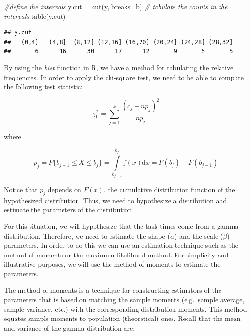 \documentclass[
]{book}
\newenvironment{Shaded}{\begin{snugshade}}{\end{snugshade}}
\newcommand{\AttributeTok}[1]{\textcolor[rgb]{0.77,0.63,0.00}{#1}}
\newcommand{\CommentTok}[1]{\textcolor[rgb]{0.56,0.35,0.01}{\textit{#1}}}
\newcommand{\FunctionTok}[1]{\textcolor[rgb]{0.00,0.00,0.00}{#1}}
\newcommand{\NormalTok}[1]{#1}
\newcommand{\OtherTok}[1]{\textcolor[rgb]{0.56,0.35,0.01}{#1}}
\theoremstyle{definition}
\theoremstyle{definition}
\theoremstyle{definition}
\theoremstyle{definition}
\theoremstyle{remark}
\begin{document}
\begin{Shaded}
\begin{Highlighting}[]
\CommentTok{\#define the intervals}
\NormalTok{y.cut }\OtherTok{=} \FunctionTok{cut}\NormalTok{(y, }\AttributeTok{breaks=}\NormalTok{b)}
\CommentTok{\# tabulate the counts in the intervals}
\FunctionTok{table}\NormalTok{(y.cut)}
\end{Highlighting}
\end{Shaded}

\begin{verbatim}
## y.cut
##   (0,4]   (4,8]  (8,12] (12,16] (16,20] (20,24] (24,28] (28,32] 
##       6      16      30      17      12       9       5       5
\end{verbatim}

By using the \emph{hist} function in R, we have a method for tabulating
the relative frequencies. In order to apply the chi-square test, we need
to be able to compute the following test statistic:

\begin{equation}
\chi^{2}_{0} = \sum\limits_{j=1}^{k} \frac{\left( c_{j} - np_{j} \right)^{2}}{np_{j}}
\label{eq:chisqd}
\end{equation}

where

\begin{equation}
p_j = P\{b_{j-1} \leq X \leq b_{j}\} = \int\limits_{b_{j-1}}^{b_{j}} f(x) \mathrm{d}x = F(b_{j}) - F(b_{j-1})
\label{eq:psubj}
\end{equation}

Notice that \(p_{j}\) depends on \(F(x)\), the cumulative distribution
function of the hypothesized distribution. Thus, we need to hypothesize
a distribution and estimate the parameters of the distribution.

For this situation, we will hypothesize that the task times come from a
gamma distribution. Therefore, we need to estimate the shape (\(\alpha\))
and the scale (\(\beta\)) parameters. In order to do this we can use an
estimation technique such as the method of moments or the maximum
likelihood method. For simplicity and illustrative purposes, we will use
the method of moments to estimate the parameters.

The method of moments is a technique for constructing estimators of the
parameters that is based on matching the sample moments (e.g.~sample
average, sample variance, etc.) with the corresponding distribution
moments. This method equates sample moments to population (theoretical)
ones. Recall that the mean and variance of the gamma distribution are:
\end{document}
